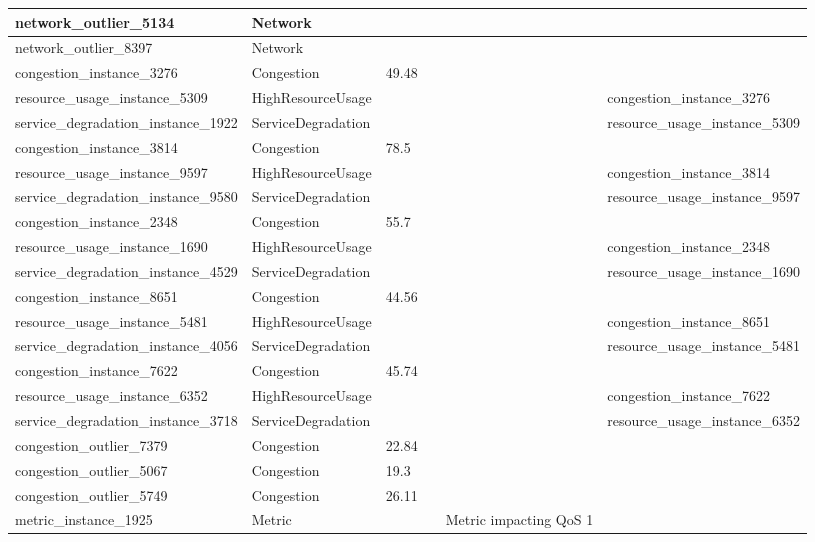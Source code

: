 \begin{longtable}{|l|p{2cm}|l|l|p{3cm}|p{3cm}|}
network\_outlier\_5134 & Network &  &  &  &  \\ \hline
network\_outlier\_8397 & Network &  &  &  &  \\ \hline
congestion\_instance\_3276 & Congestion & 49.48 &  &  &  \\ \hline
resource\_usage\_instance\_5309 & HighResourceUsage &  &  &  & congestion\_instance\_3276 \\ \hline
service\_degradation\_instance\_1922 & ServiceDegradation &  &  &  & resource\_usage\_instance\_5309 \\ \hline
congestion\_instance\_3814 & Congestion & 78.5 &  &  &  \\ \hline
resource\_usage\_instance\_9597 & HighResourceUsage &  &  &  & congestion\_instance\_3814 \\ \hline
service\_degradation\_instance\_9580 & ServiceDegradation &  &  &  & resource\_usage\_instance\_9597 \\ \hline
congestion\_instance\_2348 & Congestion & 55.7 &  &  &  \\ \hline
resource\_usage\_instance\_1690 & HighResourceUsage &  &  &  & congestion\_instance\_2348 \\ \hline
service\_degradation\_instance\_4529 & ServiceDegradation &  &  &  & resource\_usage\_instance\_1690 \\ \hline
congestion\_instance\_8651 & Congestion & 44.56 &  &  &  \\ \hline
resource\_usage\_instance\_5481 & HighResourceUsage &  &  &  & congestion\_instance\_8651 \\ \hline
service\_degradation\_instance\_4056 & ServiceDegradation &  &  &  & resource\_usage\_instance\_5481 \\ \hline
congestion\_instance\_7622 & Congestion & 45.74 &  &  &  \\ \hline
resource\_usage\_instance\_6352 & HighResourceUsage &  &  &  & congestion\_instance\_7622 \\ \hline
service\_degradation\_instance\_3718 & ServiceDegradation &  &  &  & resource\_usage\_instance\_6352 \\ \hline
congestion\_outlier\_7379 & Congestion & 22.84 &  &  &  \\ \hline
congestion\_outlier\_5067 & Congestion & 19.3 &  &  &  \\ \hline
congestion\_outlier\_5749 & Congestion & 26.11 &  &  &  \\ \hline
metric\_instance\_1925 & Metric &  &  & Metric impacting QoS 1 &  \\ \hline

\end{longtable}
